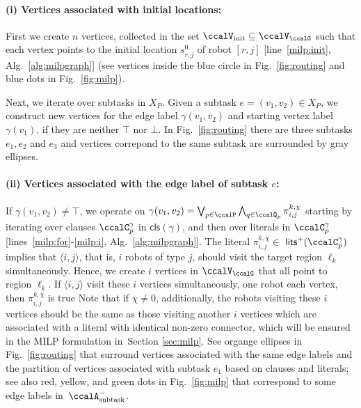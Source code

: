 \documentclass[Afour,sageh,times]{sagej}
\newcommand{\clause}[1]{\mathsf{cls}(#1)}
\newcommand{\auto}[1]{\ccalA_{\textup{#1}}}
\newcommand{\ag}[2]{\langle#1,#2\rangle}
\renewcommand{\ap}[3]{\mathcal{\pi}_{{#1},{#2}}^{#3}}
\begin{document}
\paragraph{(i) Vertices associated with initial locations:}\label{vertex:initial} First we create $n$ vertices, collected in the set $\ccalV_{\text{init}}\subseteq \ccalV_{\ccalG}$ such that each vertex points to the initial location $s^0_{r,j}$ of robot $[r,j]$ [line~\ref{milp:init}, Alg.~\ref{alg:milpgraph}] (see vertices inside the blue circle in Fig.~\ref{fig:routing} and blue dots in Fig.~\ref{fig:milp}).

Next, we iterate over subtasks in $X_{P}$. Given a subtask $e = (v_1, v_2) \in X_{P}$, we construct new vertices for the  edge label $\gamma(v_1, v_2)$ and starting vertex label $\gamma(v_1)$, if they are neither $\top$ nor $\bot$. In Fig.~\ref{fig:routing} there are three subtasks $e_1, e_2$ and $e_3$  and vertices correpond to the same subtask are surrounded by gray ellipses.

\paragraph{(ii) Vertices associated with the edge label of subtask $e$:}\label{vertex:edge} If $\gamma(v_1, v_2) \not= \top$, we operate on $\gamma(v_1, v_2) =  \bigvee_{p\in \ccalP} \bigwedge_{q \in \ccalQ_{p}} \ap{i}{j}{k,\chi}$ starting by iterating over clauses $\ccalC_p^{\gamma}$ in $\clause{\gamma}$, and then over literals in $\ccalC_p^\gamma$ [lines~\ref{milp:for}-\ref{milp:i}, Alg.~\ref{alg:milpgraph}].
The literal $\ap{i}{j}{k,\chi}\in $ $\mathsf{lits}^+(\ccalC_p^{\gamma})$ implies that $\ag{i}{j}$, that is, $i$ robots of type $j$,  should visit the target region $\ell_k$ simultaneously. Hence, we create $i$ vertices in $\ccalV_\ccalG$  that all point to region $\ell_k$. If $\ag{i}{j}$ visit these $i$ vertices simultaneously, one robot each vertex, then $\ap{i}{j}{k,\chi}$ is true Note that if $\chi\not=0$, additionally, the robots visiting these $i$ vertices should be the same as those visiting another $i$ vertices which are associated with a literal with identical non-zero connector, which will be ensured in the MILP formulation in~Section \ref{sec:milp}. See organge ellipses in Fig.~\ref{fig:routing} that surround vertices associated with the same edge labels and the partition of vertices associated with subtask $e_1$ based on clauses and literals; see also red, yellow, and green dots in Fig.~\ref{fig:milp} that correspond to some edge labels in~$\auto{subtask}^-$.
\end{document}
